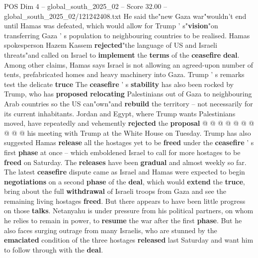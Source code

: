 \begin{textsample}{POS Dim 4 – global\_south\_2025\_02 – Score 32.00 – global\_south\_2025\_02/121242408.txt}
He said the"new Gaza war"wouldn't end until Hamas was defeated, which would allow for Trump ' s"\textbf{vision}"on transferring Gaza ' s population to neighbouring countries to be realised.
Hamas spokesperson Hazem Kassem \textbf{rejected}"the language of US and Israeli threats"and called on Israel to \textbf{implement} the \textbf{terms} of the \textbf{ceasefire} \textbf{deal}.
Among other claims, Hamas says Israel is not allowing an agreed-upon number of tents, prefabricated homes and heavy machinery into Gaza.
Trump ' s remarks test the delicate \textbf{truce} The \textbf{ceasefire} ' s \textbf{stability} has also been rocked by Trump, who has \textbf{proposed} \textbf{relocating} Palestinians out of Gaza to neighbouring Arab countries so the US can"own"and \textbf{rebuild} the territory -- not necessarily for its current inhabitants.
Jordan and Egypt, where Trump wants Palestinians moved, have repeatedly and vehemently \textbf{rejected} the \textbf{proposal} @ @ @ @ @ @ @ @ @ @ his meeting with Trump at the White House on Tuesday.
Trump has also suggested Hamas \textbf{release} all the hostages yet to be \textbf{freed} under the \textbf{ceasefire} ' s first \textbf{phase} at once -- which emboldened Israel to call for more hostages to be \textbf{freed} on Saturday.
The \textbf{releases} have been \textbf{gradual} and almost weekly so far.
The latest \textbf{ceasefire} dispute came as Israel and Hamas were expected to begin \textbf{negotiations} on a second \textbf{phase} of the \textbf{deal}, which would \textbf{extend} the \textbf{truce}, bring about the full \textbf{withdrawal} of Israeli troops from Gaza and see the remaining living hostages \textbf{freed}.
But there appears to have been little progress on those \textbf{talks}.
Netanyahu is under pressure from his political partners, on whom he relies to remain in power, to \textbf{resume} the war after the first \textbf{phase}.
But he also faces surging outrage from many Israelis, who are stunned by the \textbf{emaciated} condition of the three hostages \textbf{released} last Saturday and want him to follow through with the \textbf{deal}.

\end{textsample}
